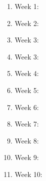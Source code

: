 \documentclass[oneside,11pt,dvipsnames]{book}
\numberwithin{equation}{section}
\theoremstyle{definition}
\theoremstyle{remark}
\begin{document}
\begin{enumerate}
    \item Week 1: 
    \item Week 2:
    \item Week 3: 
    \item Week 3:    
    \item Week 4:
    \item Week 5:
    \item Week 6:
    \item Week 7:
    \item Week 8:
    \item Week 9:
    \item Week 10:
\end{enumerate}    





\appendix
\end{document}
